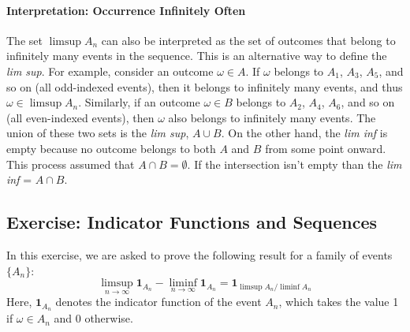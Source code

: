     \paragraph{Interpretation: Occurrence Infinitely Often}
    The set $\limsup A_n$ can also be interpreted as the set of outcomes that belong to infinitely many events in the sequence. This is an alternative way to define the \textit{lim sup}. For example, consider an outcome $\omega \in A$. If $\omega$ belongs to $A_1$, $A_3$, $A_5$, and so on (all odd-indexed events), then it belongs to infinitely many events, and thus $\omega \in \limsup A_n$. \newline
    Similarly, if an outcome $\omega \in B$ belongs to $A_2$, $A_4$, $A_6$, and so on (all even-indexed events), then $\omega$ also belongs to infinitely many events. The union of these two sets is the \textit{lim sup}, $A \cup B$. \newline
    On the other hand, the \textit{lim inf} is empty because no outcome belongs to both $A$ and $B$ from some point onward. \newline
    This process assumed that $A \cap B = \emptyset$. If the intersection isn't empty than the \emph{lim inf} = $A \cap B$.
    
    \subsection{Exercise: Indicator Functions and Sequences}
    In this exercise, we are asked to prove the following result for a family of events $\{A_n\}$:
    \[
    \limsup_{n \to \infty} \mathbf{1}_{A_n} - \liminf_{n \to \infty} \mathbf{1}_{A_n} = \mathbf{1}_{\limsup A_n / \liminf A_n }
    \]
    Here, $\mathbf{1}_{A_n}$ denotes the indicator function of the event $A_n$, which takes the value 1 if $\omega \in A_n$ and 0 otherwise.
    
